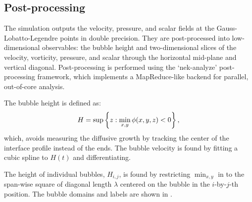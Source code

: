 \subsection{Post-processing}
The simulation outputs the velocity, pressure, and scalar fields at the Gauss-Lobatto-Legendre points in double precision.
They are post-processed into low-dimensional observables: the bubble height and two-dimensional slices of the velocity, vorticity, pressure, and scalar through the horizontal mid-plane and vertical diagonal.
Post-processing is performed using the `nek-analyze' post-processing framework, which implements a MapReduce-like backend for parallel, out-of-core analysis.

The bubble height is defined as:
\begin{equation} \elabel{h_exp}
H = \sup \left\{ z : \min_{x,y} \phi(x,y,z) < 0\right\},
\end{equation}
which, avoids measuring the diffusive growth by tracking the center of the interface profile instead of the ends.
The bubble velocity is found by fitting a cubic spline to $H(t)$ and differentiating.

The height of individual bubbles, $H_{i,j}$, is found by restricting $\min_{x,y}$ in  to the span-wise square of diagonal length $\lambda$ centered on the bubble in the $i$-by-$j$-th position.
The bubble domains and labels are shown in .

